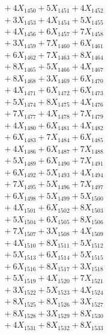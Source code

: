 \documentclass[a4paper,10pt]{article}
\begin{document}
{\begin{align}
&\;  + 4 X_{1450} + 5 X_{1451} + 4 X_{1452} \\[0.3ex]
&\;  + 3 X_{1453} + 4 X_{1454} + 5 X_{1455} \\[0.3ex]
&\;  + 4 X_{1456} + 6 X_{1457} + 7 X_{1458} \\[0.3ex]
&\;  + 3 X_{1459} + 7 X_{1460} + 6 X_{1461} \\[0.3ex]
&\;  + 6 X_{1462} + 7 X_{1463} + 8 X_{1464} \\[0.3ex]
&\;  + 8 X_{1465} + 5 X_{1466} + 4 X_{1467} \\[0.3ex]
&\;  + 8 X_{1468} + 3 X_{1469} + 6 X_{1470} \\[0.3ex]
&\;  + 4 X_{1471} + 6 X_{1472} + 6 X_{1473} \\[0.3ex]
&\;  + 5 X_{1474} + 8 X_{1475} + 4 X_{1476} \\[0.3ex]
&\;  + 7 X_{1477} + 4 X_{1478} + 7 X_{1479} \\[0.5ex]\allowbreak
&\;  + 4 X_{1480} + 6 X_{1481} + 4 X_{1482} \\[0.3ex]
&\;  + 6 X_{1483} + 7 X_{1484} + 6 X_{1485} \\[0.3ex]
&\;  + 4 X_{1486} + 6 X_{1487} + 7 X_{1488} \\[0.3ex]
&\;  + 5 X_{1489} + 6 X_{1490} + 7 X_{1491} \\[0.3ex]
&\;  + 6 X_{1492} + 5 X_{1493} + 4 X_{1494} \\[0.3ex]
&\;  + 7 X_{1495} + 5 X_{1496} + 7 X_{1497} \\[0.3ex]
&\;  + 6 X_{1498} + 5 X_{1499} + 5 X_{1500} \\[0.3ex]
&\;  + 4 X_{1501} + 6 X_{1502} + 8 X_{1503} \\[0.3ex]
&\;  + 5 X_{1504} + 6 X_{1505} + 8 X_{1506} \\[0.3ex]
&\;  + 7 X_{1507} + 3 X_{1508} + 4 X_{1509} \\[0.5ex]\allowbreak
&\;  + 4 X_{1510} + 8 X_{1511} + 5 X_{1512} \\[0.3ex]
&\;  + 5 X_{1513} + 6 X_{1514} + 5 X_{1515} \\[0.3ex]
&\;  + 6 X_{1516} + 8 X_{1517} + 3 X_{1518} \\[0.3ex]
&\;  + 5 X_{1519} + 4 X_{1520} + 7 X_{1521} \\[0.3ex]
&\;  + 3 X_{1522} + 5 X_{1523} + 4 X_{1524} \\[0.3ex]
&\;  + 8 X_{1525} + 8 X_{1526} + 3 X_{1527} \\[0.3ex]
&\;  + 8 X_{1528} + 3 X_{1529} + 8 X_{1530} \\[0.3ex]
&\;  + 4 X_{1531} + 8 X_{1532} + 8 X_{1533} \\[0.3ex]

\end{align}}
\end{document}
